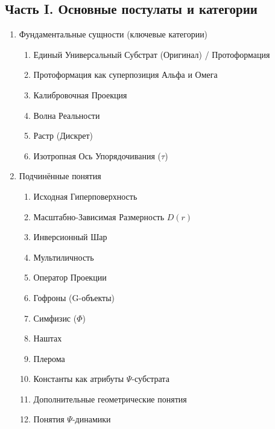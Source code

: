 \documentclass[a4paper,12pt]{article}
\begin{document}
\subsection*{Часть I. Основные постулаты и категории}
\begin{enumerate}[label=1.\arabic*.]
	\item Фундаментальные сущности (ключевые категории)
	\begin{enumerate}[label=1.1.\arabic*.]
		\item Единый Универсальный Субстрат (Оригинал) / Протоформация
		\item Протоформация как суперпозиция Альфа и Омега
		\item Калибровочная Проекция
		\item Волна Реальности
		\item Растр (Дискрет)
		\item Изотропная Ось Упорядочивания ($\tau$)
	\end{enumerate}
	\item Подчинённые понятия
	\begin{enumerate}[label=1.2.\arabic*.]
		\item Исходная Гиперповерхность
		\item Масштабно-Зависимая Размерность $D(r)$
		\item Инверсионный Шар
		\item Мультиличность
		\item Оператор Проекции
		\item Гофроны (G-объекты)
		\item Симфизис ($\Phi$)
		\item Наштах
		\item Плерома
		\item Константы как атрибуты $\Psi$-субстрата
		\item Дополнительные геометрические понятия
		\item Понятия $\Psi$-динамики
	\end{enumerate}
\end{enumerate}
\end{document}
